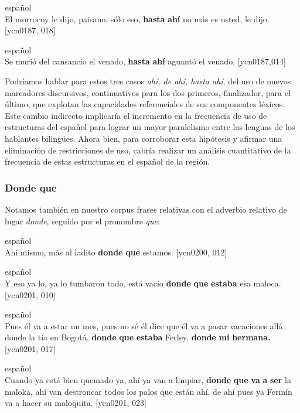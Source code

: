 \documentclass[output=paper]{langscibook}
\begin{document}
\ea
{español}\\
El morrocoy le dijo, paisano, sólo eso, \textbf{hasta} \textbf{ahí} no más es usted, le dijo. {[ycn0187, 018]}\\
\z

\ea
{español}\\
Se murió del cansancio el venado, \textbf{hasta} \textbf{ahí} aguantó el venado. {[ycn0187,014]}\\
\z

Podríamos hablar para estos tres casos \textit{ahí, de ahí, hasta ahí}, del uso de nuevos marcadores discursivos, continuativos para los dos primeros, finalizador, para el último, que explotan las capacidades referenciales de sus componentes léxicos. Este cambio indirecto implicaría el incremento en la frecuencia de uso de estructuras del español para lograr un mayor paralelismo entre las lenguas de los hablantes bilingües.  Ahora bien, para corroborar esta hipótesis y afirmar una eliminación de restricciones de uso, cabría realizar un análisis cuantitativo de la frecuencia de estas estructuras en el español de la región. 


\subsubsection{Donde que}


Notamos también en nuestro corpus frases relativas con el adverbio relativo de lugar \textit{donde}, seguido por el pronombre \textit{que}: 

\ea
{español}\\
Ahí mismo, más al ladito \textbf{donde} \textbf{que} estamos. {[ycn0200, 012]}\\
\z

\ea
{español}\\
Y eso ya lo, ya lo tumbaron todo, está vacío \textbf{donde} \textbf{que} \textbf{estaba} esa maloca. {[ycn0201, 010]}\\
\z

\ea
{español}\\
Pues él va a estar un mes, pues no sé él dice que él va a pasar vacaciones allá donde la tía en Bogotá, \textbf{donde} \textbf{que} \textbf{estaba} Ferley, \textbf{donde} \textbf{mi} \textbf{hermana.} {[ycn0201, 017]}\\
\z

\ea\label{ex:lemus:32}
{español}\\
Cuando ya está bien quemado ya, ahí ya van a limpiar, \textbf{donde} \textbf{que} \textbf{va} \textbf{a} \textbf{ser} la maloka, ahí van destroncar todos los palos que están ahí, de ahí pues ya Fermín va a hacer su maloquita. {[ycn0201, 023]}\\
\z
\end{document}

